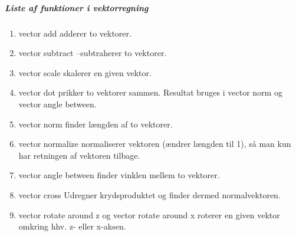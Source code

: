 \subparagraph{Liste af funktioner i vektorregning}
\begin{enumerate}

  \item vector add adderer to vektorer.
  \item vector subtract –subtraherer to vektorer.
  \item vector scale skalerer en given vektor.
  \item vector dot prikker to vektorer sammen. Resultat bruges i vector norm og vector angle between.
  \item vector norm finder længden af to vektorer.
  \item vector normalize normaliserer vektoren (ændrer længden til 1), så man kun har retningen af vektoren tilbage.
  \item vector angle between finder vinklen mellem to vektorer.
  \item vector cross Udregner krydsproduktet og finder dermed normalvektoren.
  \item vector rotate around z og vector rotate around x roterer en given vektor omkring hhv. z- eller x-aksen.

\end{enumerate}